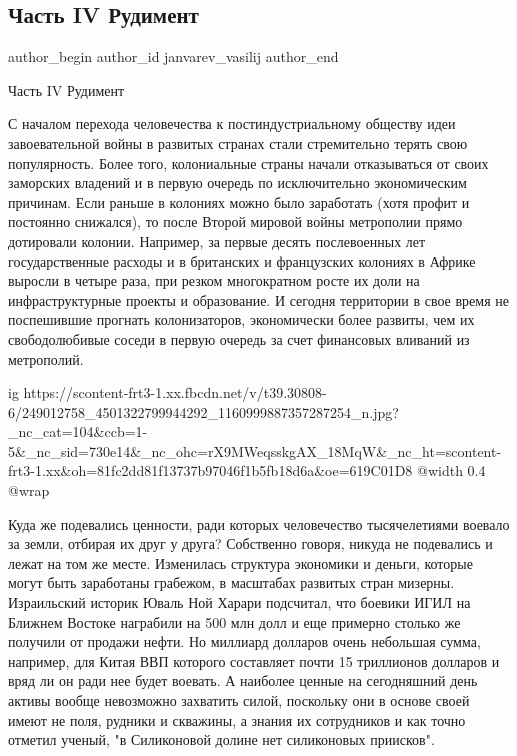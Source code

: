  
 
 
 
 
 
\subsection{Часть IV Рудимент}
\label{sec:29_10_2021.fb.janvarev_vasilij.1.chast_4_rudiment}
 
\ifcmt
 author_begin
   author_id janvarev_vasilij
 author_end
\fi

Часть IV Рудимент

С началом перехода человечества к постиндустриальному обществу идеи
завоевательной войны в развитых странах стали стремительно терять свою
популярность. Более того, колониальные страны начали отказываться от своих
заморских владений и в первую очередь по исключительно экономическим причинам.
Если раньше в колониях можно было заработать (хотя профит и постоянно
снижался), то после Второй мировой войны метрополии прямо дотировали колонии.
Например, за первые десять послевоенных лет государственные расходы и в
британских и французских колониях в Африке выросли в четыре раза, при резком
многократном росте их доли на инфраструктурные проекты и образование. И сегодня
территории в свое время не поспешившие прогнать колонизаторов, экономически
более развиты, чем их свободолюбивые соседи в первую очередь за счет финансовых
вливаний из метрополий.

\ifcmt
  ig https://scontent-frt3-1.xx.fbcdn.net/v/t39.30808-6/249012758_4501322799944292_1160999887357287254_n.jpg?_nc_cat=104&ccb=1-5&_nc_sid=730e14&_nc_ohc=rX9MWeqsskgAX_18MqW&_nc_ht=scontent-frt3-1.xx&oh=81fc2dd81f13737b97046f1b5fb18d6a&oe=619C01D8
  @width 0.4
  @wrap 
\fi

Куда же подевались ценности, ради которых человечество тысячелетиями воевало за
земли, отбирая их друг у друга? Собственно говоря, никуда не подевались и лежат
на том же месте. Изменилась структура экономики и деньги, которые могут быть
заработаны грабежом, в масштабах развитых стран мизерны. Израильский историк
Юваль Ной Харари подсчитал, что боевики ИГИЛ на Ближнем Востоке награбили на
500 млн долл и еще примерно столько же получили от продажи нефти. Но миллиард
долларов очень небольшая сумма, например, для Китая ВВП которого составляет
почти 15 триллионов долларов и вряд ли он ради нее будет воевать. А наиболее
ценные на сегодняшний день активы вообще невозможно захватить силой, поскольку
они в основе своей имеют не поля, рудники и скважины, а знания их сотрудников и
как точно отметил ученый, "в Силиконовой долине нет силиконовых приисков".

